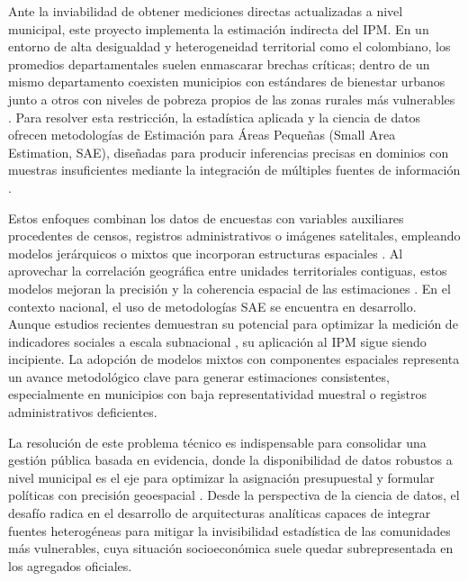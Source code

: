 Ante la inviabilidad de obtener mediciones directas actualizadas a nivel municipal, este proyecto implementa la estimación indirecta del IPM. En un entorno de alta desigualdad y heterogeneidad territorial como el colombiano, los promedios departamentales suelen enmascarar brechas críticas; dentro de un mismo departamento coexisten municipios con estándares de bienestar urbanos junto a otros con niveles de pobreza propios de las zonas rurales más vulnerables \cite{CEPAL_PanoramaSocial_2023}. Para resolver esta restricción, la estadística aplicada y la ciencia de datos ofrecen metodologías de Estimación para Áreas Pequeñas (Small Area Estimation, SAE), diseñadas para producir inferencias precisas en dominios con muestras insuficientes mediante la integración de múltiples fuentes de información \cite{RaoMolina_2015}.

Estos enfoques combinan los datos de encuestas con variables auxiliares procedentes de censos, registros administrativos o imágenes satelitales, empleando modelos jerárquicos o mixtos que incorporan estructuras espaciales \cite{MolinaRao_2010}. Al aprovechar la correlación geográfica entre unidades territoriales contiguas, estos modelos mejoran la precisión y la coherencia espacial de las estimaciones \cite{PratesiSalvati_2019}. En el contexto nacional, el uso de metodologías SAE se encuentra en desarrollo. Aunque estudios recientes demuestran su potencial para optimizar la medición de indicadores sociales a escala subnacional \cite{DANE_PobrezaMultidimensional_2023} \cite{LopezSanchezPerez_2021}, su aplicación al IPM sigue siendo incipiente. La adopción de modelos mixtos con componentes espaciales representa un avance metodológico clave para generar estimaciones consistentes, especialmente en municipios con baja representatividad muestral o registros administrativos deficientes.

La resolución de este problema técnico es indispensable para consolidar una gestión pública basada en evidencia, donde la disponibilidad de datos robustos a nivel municipal es el eje para optimizar la asignación presupuestal y formular políticas con precisión geoespacial \cite{PNUD_HDR_2022}. Desde la perspectiva de la ciencia de datos, el desafío radica en el desarrollo de arquitecturas analíticas capaces de integrar fuentes heterogéneas para mitigar la invisibilidad estadística de las comunidades más vulnerables, cuya situación socioeconómica suele quedar subrepresentada en los agregados oficiales.